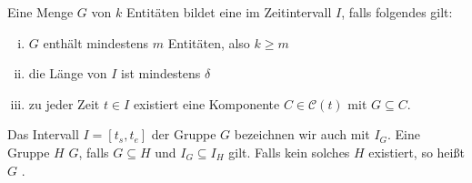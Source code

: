 \begin{definition}[{name=[Gruppe während eines Zeitraums]},label=def:gruppe]
	Eine Menge $G$ von $k$ Entitäten bildet eine  im Zeitintervall $I$, falls folgendes gilt:
	\begin{enumerate}[(i)]
		\item $G$ enthält mindestens $m$ Entitäten, also $k \ge m$
		\item die Länge von $I$ ist mindestens $\delta$
		\item\label{enum:3:def:gruppe}zu jeder Zeit $t \in I$ existiert eine Komponente $C \in \mathcal{C}(t)$ mit $G \subseteq C$.
	\end{enumerate}
	Das Intervall $I=[t_s,t_e]$ der Gruppe $G$ bezeichnen wir auch mit $I_G$.
	Eine Gruppe $H$  $G$, falls $G \subseteq H$ und $I_G \subseteq I_H$ gilt.
	Falls kein solches $H$ existiert, so heißt $G$ .
\end{definition}


